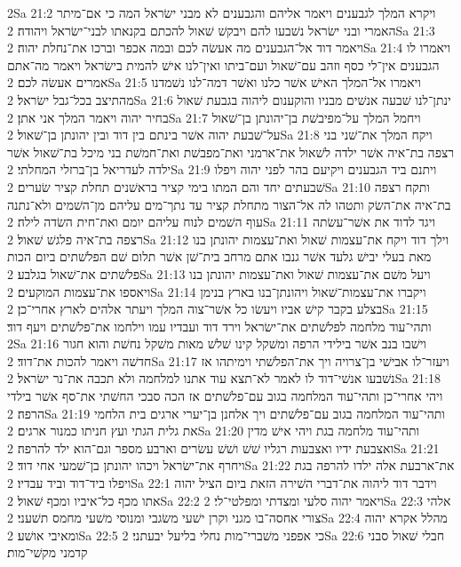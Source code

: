2Sa 21:2  ויקרא המלך לגבענים ויאמר אליהם והגבענים לא מבני ישׂראל המה כי אם־מיתר האמרי ובני ישׂראל נשׁבעו להם ויבקשׁ שׁאול להכתם בקנאתו לבני־ישׂראל ויהודה׃
2Sa 21:3  ויאמר דוד אל־הגבענים מה אעשׂה לכם ובמה אכפר וברכו את־נחלת יהוה׃
2Sa 21:4  ויאמרו לו הגבענים אין־לי כסף וזהב עם־שׁאול ועם־ביתו ואין־לנו אישׁ להמית בישׂראל ויאמר מה־אתם אמרים אעשׂה לכם׃
2Sa 21:5  ויאמרו אל־המלך האישׁ אשׁר כלנו ואשׁר דמה־לנו נשׁמדנו מהתיצב בכל־גבל ישׂראל׃
2Sa 21:6  ינתן־לנו שׁבעה אנשׁים מבניו והוקענום ליהוה בגבעת שׁאול בחיר יהוה ויאמר המלך אני אתן׃
2Sa 21:7  ויחמל המלך על־מפיבשׁת בן־יהונתן בן־שׁאול על־שׁבעת יהוה אשׁר בינתם בין דוד ובין יהונתן בן־שׁאול׃
2Sa 21:8  ויקח המלך את־שׁני בני רצפה בת־איה אשׁר ילדה לשׁאול את־ארמני ואת־מפבשׁת ואת־חמשׁת בני מיכל בת־שׁאול אשׁר ילדה לעדריאל בן־ברזלי המחלתי׃
2Sa 21:9  ויתנם ביד הגבענים ויקיעם בהר לפני יהוה ויפלו שׁבעתים יחד והם המתו בימי קציר בראשׁנים תחלת קציר שׂערים׃
2Sa 21:10  ותקח רצפה בת־איה את־השׂק ותטהו לה אל־הצור מתחלת קציר עד נתך־מים עליהם מן־השׁמים ולא־נתנה עוף השׁמים לנוח עליהם יומם ואת־חית השׂדה לילה׃
2Sa 21:11  ויגד לדוד את אשׁר־עשׂתה רצפה בת־איה פלגשׁ שׁאול׃
2Sa 21:12  וילך דוד ויקח את־עצמות שׁאול ואת־עצמות יהונתן בנו מאת בעלי יבישׁ גלעד אשׁר גנבו אתם מרחב בית־שׁן אשׁר תלום שׁם הפלשׁתים ביום הכות פלשׁתים את־שׁאול בגלבע׃
2Sa 21:13  ויעל משׁם את־עצמות שׁאול ואת־עצמות יהונתן בנו ויאספו את־עצמות המוקעים׃
2Sa 21:14  ויקברו את־עצמות־שׁאול ויהונתן־בנו בארץ בנימן בצלע בקבר קישׁ אביו ויעשׂו כל אשׁר־צוה המלך ויעתר אלהים לארץ אחרי־כן׃
2Sa 21:15  ותהי־עוד מלחמה לפלשׁתים את־ישׂראל וירד דוד ועבדיו עמו וילחמו את־פלשׁתים ויעף דוד׃
2Sa 21:16  וישׁבו בנב אשׁר בילידי הרפה ומשׁקל קינו שׁלשׁ מאות משׁקל נחשׁת והוא חגור חדשׁה ויאמר להכות את־דוד׃
2Sa 21:17  ויעזר־לו אבישׁי בן־צרויה ויך את־הפלשׁתי וימיתהו אז נשׁבעו אנשׁי־דוד לו לאמר לא־תצא עוד אתנו למלחמה ולא תכבה את־נר ישׂראל׃
2Sa 21:18  ויהי אחרי־כן ותהי־עוד המלחמה בגוב עם־פלשׁתים אז הכה סבכי החשׁתי את־סף אשׁר בילדי הרפה׃
2Sa 21:19  ותהי־עוד המלחמה בגוב עם־פלשׁתים ויך אלחנן בן־יערי ארגים בית הלחמי את גלית הגתי ועץ חניתו כמנור ארגים׃
2Sa 21:20  ותהי־עוד מלחמה בגת ויהי אישׁ מדין ואצבעת ידיו ואצבעות רגליו שׁשׁ ושׁשׁ עשׂרים וארבע מספר וגם־הוא ילד להרפה׃
2Sa 21:21  ויחרף את־ישׂראל ויכהו יהונתן בן־שׁמעי אחי דוד׃
2Sa 21:22  את־ארבעת אלה ילדו להרפה בגת ויפלו ביד־דוד וביד עבדיו׃
2Sa 22:1  וידבר דוד ליהוה את־דברי השׁירה הזאת ביום הציל יהוה אתו מכף כל־איביו ומכף שׁאול׃
2Sa 22:2  ויאמר יהוה סלעי ומצדתי ומפלטי־לי׃
2Sa 22:3  אלהי צורי אחסה־בו מגני וקרן ישׁעי משׂגבי ומנוסי משׁעי מחמס תשׁעני׃
2Sa 22:4  מהלל אקרא יהוה ומאיבי אושׁע׃
2Sa 22:5  כי אפפני משׁברי־מות נחלי בליעל יבעתני׃
2Sa 22:6  חבלי שׁאול סבני קדמני מקשׁי־מות׃
